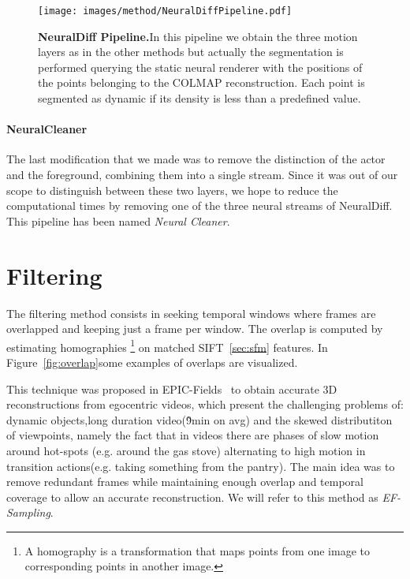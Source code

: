 \begin{figure}[t]
    \centering
    \texttt{[image: images/method/NeuralDiffPipeline.pdf]} 
    \caption{\textbf{NeuralDiff Pipeline.}In this pipeline we obtain the three motion layers as in the other methods
    but actually the segmentation is performed querying the static neural renderer with the positions
    of the points belonging to the COLMAP reconstruction. Each point is segmented as dynamic 
    if its density is less than a predefined value.}\label{fig:ndiffPipe}
\end{figure}

\paragraph{NeuralCleaner}The last modification that we made was to remove the distinction of the actor and the foreground, combining them into a single stream.
Since it was out of our scope to distinguish between these two layers, we hope to reduce the computational times by removing one of the
three neural streams of NeuralDiff. This pipeline has been named \textit{Neural Cleaner}.


\section{Filtering }\label{sec:sampl}
The filtering method consists 
in seeking temporal windows where frames are overlapped and keeping just
a frame per window. The overlap is computed by estimating homographies
\footnote{A homography is a transformation that maps points from one
 image to corresponding points in another image.
} on matched SIFT~\ref{sec:sfm} features. In Figure~\ref{fig:overlap}some examples 
of overlaps are visualized. 

This technique was proposed in EPIC-Fields~\cite{epic_fields} to obtain accurate 3D reconstructions
from egocentric videos, which present the challenging problems of: dynamic objects,long duration video(\~9min on avg) and
the skewed distributiton of viewpoints, namely the fact that in videos there are phases of slow motion around 
hot-spots (e.g. around the gas stove) alternating to high motion in transition actions(e.g. taking something from the pantry).
The main idea was to remove redundant frames while maintaining enough overlap and temporal coverage to allow an accurate reconstruction.
We will refer to this method as \textit{EF-Sampling}.

